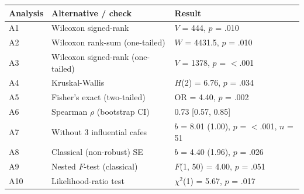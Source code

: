 \begin{tabular}{lll}
\toprule
Analysis & Alternative / check & Result \\
\midrule
A1 & Wilcoxon signed-rank & $V$ = 444, $p$ = .010 \\
A2 & Wilcoxon rank-sum (one-tailed) & $W$ = 4431.5, $p$ = .010 \\
A3 & Wilcoxon signed-rank (one-tailed) & $V$ = 1378, $p$ = $<$.001 \\
A4 & Kruskal-Wallis & $H$(2) = 6.76, $p$ = .034 \\
A5 & Fisher's exact (two-tailed) & OR = 4.40, $p$ = .002 \\
A6 & Spearman $\rho$ (bootstrap CI) & 0.73 [0.57, 0.85] \\
A7 & Without 3 influential cafes & $b$ = 8.01 (1.00), $p$ = $<$.001, $n$ = 51 \\
A8 & Classical (non-robust) SE & $b$ = 4.40 (1.96), $p$ = .026 \\
A9 & Nested $F$-test (classical) & $F$(1, 50) = 4.00, $p$ = .051 \\
A10 & Likelihood-ratio test & $\chi^2$(1) = 5.67, $p$ = .017 \\
\bottomrule
\end{tabular}
